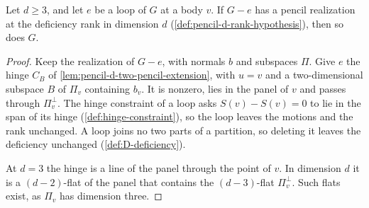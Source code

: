 \begin{lemma}
  \label{lem:pencil-d-loop-case}
  \leanok
  Let $d \ge 3$, and let $e$ be a loop of $G$ at a body $v$. If $G - e$
  has a pencil realization at the deficiency rank in dimension $d$
  (\cref{def:pencil-d-rank-hypothesis}), then so does $G$.
\end{lemma}
\begin{proof}
  \leanok
  Keep the realization of $G - e$, with normals $b$ and subspaces $\Pi$.
  Give $e$ the hinge $C_B$ of \cref{lem:pencil-d-two-pencil-extension},
  with $u = v$ and a two-dimensional subspace $B$ of $\Pi_v$ containing
  $b_v$. It is nonzero, lies in the panel of $v$ and passes through
  $\Pi_v^{\perp}$. The hinge constraint of a loop asks $S(v) - S(v) = 0$
  to lie in the span of its hinge (\cref{def:hinge-constraint}), so the
  loop leaves the motions and the rank unchanged. A loop joins no two
  parts of a partition, so deleting it leaves the deficiency unchanged
  (\cref{def:D-deficiency}).

  At $d = 3$ the hinge is a line of the panel through the point of $v$.
  In dimension $d$ it is a
  $(d-2)$-flat of the panel that contains the $(d-3)$-flat
  $\Pi_v^{\perp}$. Such flats exist, as $\Pi_v$ has dimension three.
\end{proof}

